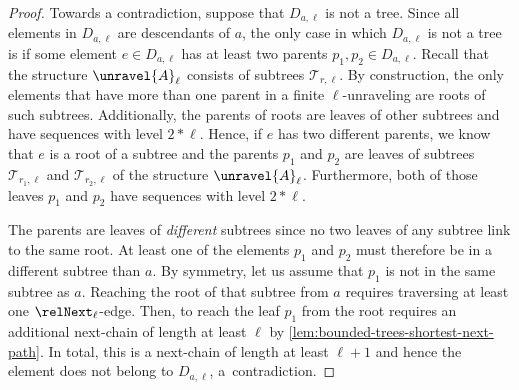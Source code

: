 \begin{proof}
  Towards a contradiction, suppose that $D_{a,\ell}$ is not a tree.
  Since all elements in $D_{a,\ell}$ are descendants of $a$, the only case in which $D_{a,\ell}$ is not a tree is if some element $e \in D_{a,\ell}$ has at least two parents $p_{1}, p_{2} \in D_{a,\ell}$.
  Recall that the structure $\unravel{A}_{\ell}$ consists of subtrees $\mathcal{T}_{r,\ell}$.
  By construction, the only elements that have more than one parent in a finite $\ell$-unraveling are roots of such subtrees.
  Additionally, the parents of roots are leaves of other subtrees and have sequences with level $2 * \ell$.
  Hence, if $e$ has two different parents, we know that $e$ is a root of a subtree and the parents $p_{1}$ and $p_{2}$ are leaves of subtrees $\mathcal{T}_{r_{1},\ell}$ and $\mathcal{T}_{r_{2},\ell}$ of the structure $\unravel{A}_{\ell}$.
  Furthermore, both of those leaves $p_{1}$ and $p_{2}$ have sequences with level $2 * \ell$.

  The parents are leaves of \emph{different} subtrees since no two leaves of any subtree link to the same root.
  At least one of the elements $p_{1}$ and $p_{2}$ must therefore be in a different subtree than $a$.
  By symmetry, let us assume that $p_{1}$ is not in the same subtree as $a$.
  Reaching the root of that subtree from $a$ requires traversing at least one $\relNext_{\ell}$-edge.
  Then, to reach the leaf $p_{1}$ from the root requires an additional next-chain of length at least $\ell$ by \cref{lem:bounded-trees-shortest-next-path}.
  In total, this is a next-chain of length at least $\ell + 1$ and hence the element does not belong to $D_{a,\ell}$, a~contradiction.
\end{proof}
\fi

